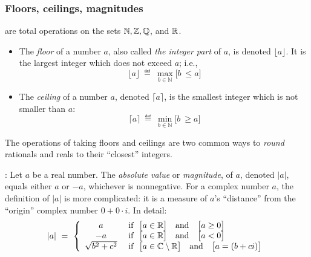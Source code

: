 \subsubsection{Floors, ceilings, magnitudes}


 are total operations on the sets $\mathbb{N}, \mathbb{Z}, \mathbb{Q}$, and $\mathbb{R}$.
\begin{itemize}
\item
The {\it floor} of a number $a$, also called {\it the integer part} of $a$, is denoted $\lfloor a \rfloor$.  It is the largest integer which does not exceed $a$; i.e.,
\[ \lfloor a \rfloor \ \eqdef \ \max_{b \in {\mathbb{N}}} \Big[ b \ \leq a \Big] \]
\medskip\item
The {\it ceiling} of a number $a$, denoted $\lceil a \rceil$, is the smallest integer which is not smaller than $a$:
\[ \lceil a \rceil \ \eqdef \ \min_{b \in {\mathbb{N}}} \Big[ b \ \geq a \Big] \]
\end{itemize}
The operations of taking floors and ceilings are two common ways to {\em round} rationals and reals to their ``closest'' integers.

\medskip

:
Let $a$ be a real number.  The {\it absolute value} or {\it magnitude}, of $a$, denoted $|a|$, equals either $a$ or $-a$, whichever is nonnegative.  For a complex number $a$, the definition of $|a|$ is more complicated: it is a measure of $a$'s ``distance'' from the ``origin'' complex number $0 + 0 \cdot i$.  In detail:
\[
|a| \ = \ \left\{
\begin{array}{cl}
a & \mbox{ if } \ \big[a \in \R \big] \ \ \mbox{ and } \ \ \big[a \geq 0\big] \\
-a & \mbox{ if } \ \big[a \in \R\big] \ \ \mbox{ and } \ \ \big[a < 0\big] \\
\sqrt{b^2 + c^2} &  \mbox{ if } \ \big[a \in \C \setminus \R\big]  \ \ \mbox{ and }  \ \ \big[a = (b+ci)\big]
\end{array}
\right.
\]

